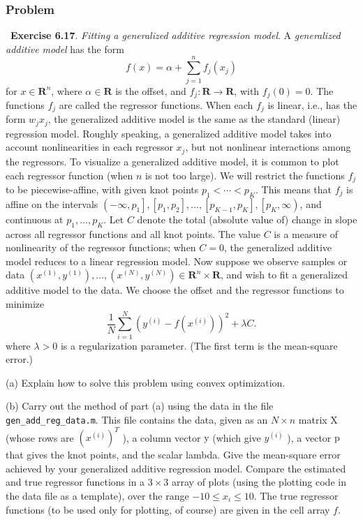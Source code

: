 \documentclass[12pt,reqno]{article}
\theoremstyle{definition}
\numberwithin{equation}{section}
\begin{document}
\subsubsection*{Problem}
~\cite{EE364a-extra}\textbf{Exercise 6.17}. \textit{Fitting a generalized additive regression model}.
A \textit{generalized additive model} has the form
\[
f(x)=\alpha+\sum_{j=1}^n f_j\left(x_j\right)
\]
for $x \in \mathbf{R}^n$, where $\alpha \in \mathbf{R}$ is the offset, and $f_j: \mathbf{R} \rightarrow \mathbf{R}$, with $f_j(0)=0$.
The functions $f_j$ are called the regressor functions. When each $f_j$ is linear, i.e., has the form $w_j x_j$,
the generalized additive model is the same as the standard (linear) regression model.
Roughly speaking, a generalized additive model takes into account nonlinearities in each regressor $x_j$, but not nonlinear interactions among the regressors.
To visualize a generalized additive model, it is common to plot each regressor function (when $n$ is not too large).
We will restrict the functions $f_j$ to be piecewise-affine, with given knot points $p_1<\cdots<p_K$. This means that $f_j$ is affine on the intervals
$\left(-\infty, p_1\right],\left[p_1, p_2\right], \ldots,\left[p_{K-1}, p_K\right],\left[p_K, \infty\right)$, and continuous at $p_1, \ldots, p_K$.
Let $C$ denote the total (absolute value of) change in slope across all regressor functions and all knot points.
The value $C$ is a measure of nonlinearity of the regressor functions; when $C=0$, the generalized additive model reduces to a linear regression model.
Now suppose we observe samples or data $\left(x^{(1)}, y^{(1)}\right), \ldots,\left(x^{(N)}, y^{(N)}\right) \in \mathbf{R}^n \times \mathbf{R}$,
and wish to fit a generalized additive model to the data. We choose the offset and the regressor functions to minimize
\[
\frac{1}{N} \sum_{i=1}^N\left(y^{(i)}-f(x^{(i)})\right)^2+\lambda C.
\]
where $\lambda>0$ is a regularization parameter. (The first term is the mean-square error.)

\vspace{0.1cm}
\noindent (a) Explain how to solve this problem using convex optimization.

\vspace{0.1cm}
\noindent (b) Carry out the method of part (a) using the data in the file \lstinline|gen_add_reg_data.m|. This file contains the data, given as an $N \times n$ matrix $\mathrm{X}$
(whose rows are $\left(x^{(i)}\right)^T$ ), a column vector $\mathrm{y}$ (which give $y^{(i)}$ ), a vector $\mathrm{p}$ that gives the knot points, and the scalar lambda.
Give the mean-square error achieved by your generalized additive regression model.
Compare the estimated and true regressor functions in a $3 \times 3$ array of plots (using the plotting code in the data file as a template), over the range $-10 \leq x_i \leq 10$. The true regressor functions (to be used only for plotting, of course) are given in the cell array $f$.
\end{document}
